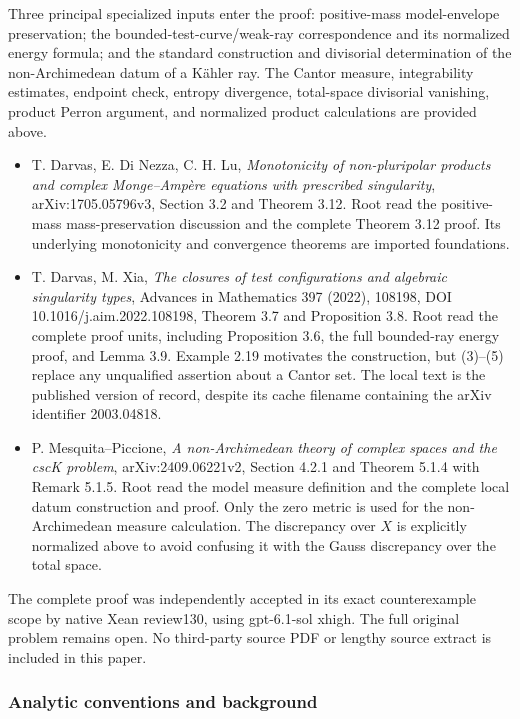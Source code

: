 \documentclass[
]{article}
\providecommand{\tightlist}{%
  \setlength{\itemsep}{0pt}\setlength{\parskip}{0pt}}
\begin{document}
Three principal specialized inputs enter the proof: positive-mass
model-envelope preservation; the bounded-test-curve/weak-ray
correspondence and its normalized energy formula; and the standard
construction and divisorial determination of the non-Archimedean datum
of a Kähler ray. The Cantor measure, integrability estimates, endpoint
check, entropy divergence, total-space divisorial vanishing, product
Perron argument, and normalized product calculations are provided above.

\begin{itemize}
\tightlist
\item
  T. Darvas, E. Di Nezza, C. H. Lu, \emph{Monotonicity of non-pluripolar
  products and complex Monge--Ampère equations with prescribed
  singularity}, arXiv:1705.05796v3, Section 3.2 and Theorem 3.12. Root
  read the positive-mass mass-preservation discussion and the complete
  Theorem 3.12 proof. Its underlying monotonicity and convergence
  theorems are imported foundations.
\item
  T. Darvas, M. Xia, \emph{The closures of test configurations and
  algebraic singularity types}, Advances in Mathematics 397 (2022),
  108198, DOI 10.1016/j.aim.2022.108198, Theorem 3.7 and Proposition
  3.8. Root read the complete proof units, including Proposition 3.6,
  the full bounded-ray energy proof, and Lemma 3.9. Example 2.19
  motivates the construction, but (3)--(5) replace any unqualified
  assertion about a Cantor set. The local text is the published version
  of record, despite its cache filename containing the arXiv identifier
  2003.04818.
\item
  P. Mesquita--Piccione, \emph{A non-Archimedean theory of complex
  spaces and the cscK problem}, arXiv:2409.06221v2, Section 4.2.1 and
  Theorem 5.1.4 with Remark 5.1.5. Root read the model measure
  definition and the complete local datum construction and proof. Only
  the zero metric is used for the non-Archimedean measure calculation.
  The discrepancy over \(X\) is explicitly normalized above to avoid
  confusing it with the Gauss discrepancy over the total space.
\end{itemize}

The complete proof was independently accepted in its exact
counterexample scope by native Xean review130, using gpt-6.1-sol xhigh.
The full original problem remains open. No third-party source PDF or
lengthy source extract is included in this paper.

\subsubsection{Analytic conventions and
background}\label{analytic-conventions-and-background}
\end{document}
